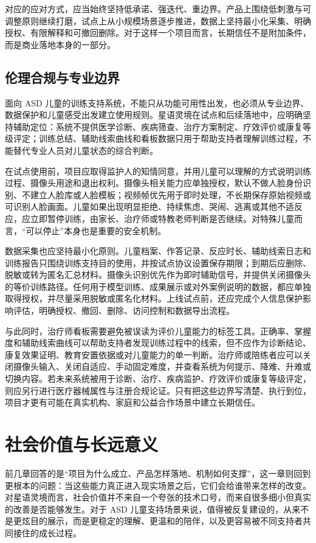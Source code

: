对应的应对方式，应当始终坚持低承诺、强迭代、重边界。产品上围绕低刺激与可调整原则继续打磨，试点上从小规模场景逐步推进，数据上坚持最小化采集、明确授权、有限解释和可撤回删除。对于这样一个项目而言，长期信任不是附加条件，而是商业落地本身的一部分。

\section{伦理合规与专业边界}
面向 ASD 儿童的训练支持系统，不能只从功能可用性出发，也必须从专业边界、数据保护和儿童感受出发建立使用规则。星语灵境在试点和后续落地中，应明确坚持辅助定位：系统不提供医学诊断、疾病筛查、治疗方案制定、疗效评价或康复等级评定；训练总结、辅助线索曲线和看板数据只用于帮助支持者理解训练过程，不能替代专业人员对儿童状态的综合判断。

在试点使用前，项目应取得监护人的知情同意，并用儿童可以理解的方式说明训练过程、摄像头用途和退出权利。摄像头相关能力应单独授权，默认不做人脸身份识别、不建立人脸库或人脸模板；视频帧优先用于即时处理，不长期保存原始视频或可识别人脸画面。儿童如果出现明显拒绝、持续焦虑、哭闹、逃离或其他不适反应，应立即暂停训练，由家长、治疗师或特教老师判断是否继续。对特殊儿童而言，“可以停止”本身也是重要的安全机制。

数据采集也应坚持最小化原则。儿童档案、作答记录、反应时长、辅助线索日志和训练报告只围绕训练支持目的使用，并按试点协议设置保存期限；到期后应删除、脱敏或转为匿名汇总材料。摄像头识别优先作为即时辅助信号，并提供关闭摄像头的等价训练路径。任何用于模型训练、成果展示或对外案例说明的数据，都应单独取得授权，并尽量采用脱敏或匿名化材料。上线试点前，还应完成个人信息保护影响评估，明确授权、撤回、删除、访问控制和数据导出流程。

与此同时，治疗师看板需要避免被误读为评价儿童能力的标签工具。正确率、掌握度和辅助线索曲线可以帮助支持者发现训练过程中的线索，但不应作为诊断结论、康复效果证明、教育安置依据或对儿童能力的单一判断。治疗师或陪练者应可以关闭摄像头输入、关闭自适应、手动固定难度，并查看系统为何提示、降难、升难或切换内容。若未来系统被用于诊断、治疗、疾病监护、疗效评价或康复等级评定，则应另行进行医疗器械属性与注册合规论证。只有把这些边界写清楚、执行到位，项目才更有可能在真实机构、家庭和公益合作场景中建立长期信任。

\chapter{社会价值与长远意义}

前几章回答的是“项目为什么成立、产品怎样落地、机制如何支撑”，这一章则回到更根本的问题：当这些能力真正进入现实场景之后，它们会给谁带来怎样的改变。对星语灵境而言，社会价值并不来自一个夸张的技术口号，而来自很多细小但真实的改善是否能够发生。对于 ASD 儿童支持场景来说，值得被反复建设的，从来不是更炫目的展示，而是更稳定的理解、更温和的陪伴，以及更容易被不同支持者共同接住的成长过程。

